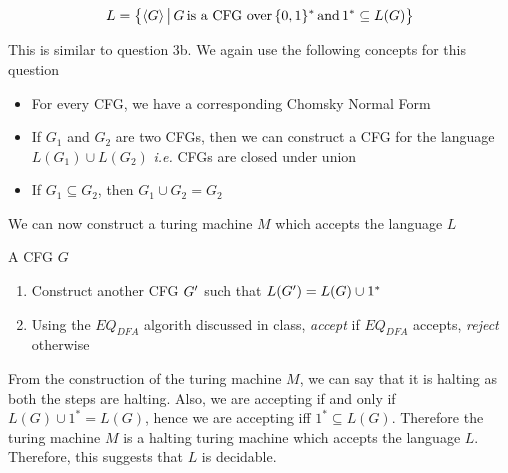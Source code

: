 \documentclass{article}
\begin{document}
\begin{question}

	\begin{align*}
		L = \big\{ \langle G \rangle \,\big|\, G \,\text{is a CFG over}\, \{0, 1\}^* \,\text{and}\, 1^* \subseteq L(G)  \big\}
	\end{align*}

	This is similar to question 3b. We again use the following concepts for this question
	\begin{itemize}
		\item For every CFG, we have a corresponding Chomsky Normal Form
		\item If $G_1$ and $G_2$ are two CFGs, then we can construct a CFG for the language $L(G_1) \cup L(G_2)$ \textit{i.e.} CFGs are closed under union
		\item If $G_1 \subseteq G_2$, then $G_1 \cup G_2 = G_2$
	\end{itemize}

	We can now construct a turing machine $M$ which accepts the language $L$ \br%

	 \br%
	\begin{margin}
		 A CFG $G$

		\begin{enumerate}
			\item Construct another CFG $G^{\prime}$ such that $L(G^{\prime}) = L(G) \cup 1^*$
			\item Using the $EQ_{DFA}$ algorith discussed in class, \textit{accept} if $EQ_{DFA}$ accepts, \textit{reject} otherwise
		\end{enumerate}
	\end{margin}

	From the construction of the turing machine $M$, we can say that it is halting as both the steps are halting. Also, we are accepting if and only if $L(G) \cup 1^* = L(G)$, hence we are accepting iff $1^* \subseteq L(G)$. Therefore the turing machine $M$ is a halting turing machine which accepts the language $L$. Therefore, this suggests that $L$ is decidable.
	
\end{question}
\end{document}
